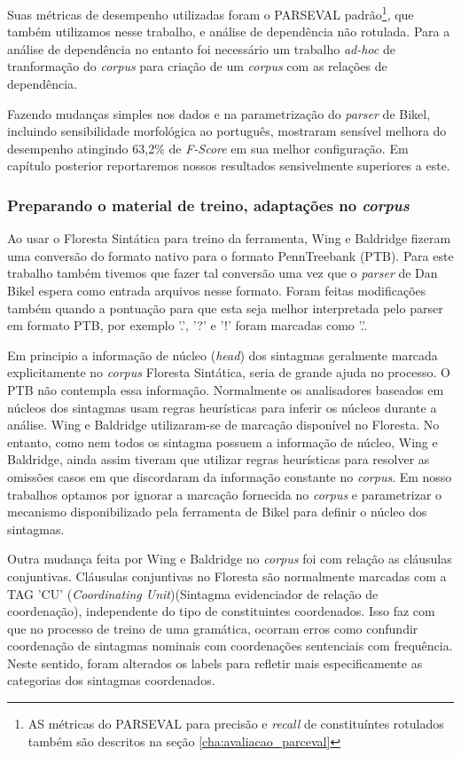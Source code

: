 Suas métricas de desempenho utilizadas foram o PARSEVAL padrão\footnote{AS métricas do PARSEVAL para precisão e \emph{recall} de constituíntes rotulados também são descritos na seção \ref{cha:avaliacao_parceval}}, que também utilizamos nesse trabalho, e análise de dependência não rotulada. Para a análise de dependência no entanto foi necessário um trabalho \emph{ad-hoc} de tranformação do \emph{corpus} para criação de um \emph{corpus} com as relações de dependência.

Fazendo mudanças simples nos dados e na parametrização do \emph{parser} de Bikel, incluindo sensibilidade morfológica ao português, mostraram sensível melhora do desempenho atingindo 63,2{\%} de \emph{F-Score} em sua melhor configuração. Em capítulo posterior reportaremos nossos resultados sensivelmente superiores a este.

\subsubsection{Preparando o material de treino, adaptações no \emph{corpus}} %
\label{sec:wing_baldridge_adapt_corpus}

Ao usar o Floresta Sintática para treino da ferramenta, Wing e Baldridge fizeram uma conversão do formato nativo para o formato PennTreebank (PTB). Para este trabalho também tivemos que fazer tal conversão uma vez que o \emph{parser} de Dan Bikel espera como entrada arquivos nesse formato. Foram feitas modificações também quando a pontuação para que esta seja melhor interpretada pelo parser em formato PTB, por exemplo '.', '?' e '!' foram marcadas como '.'. 

Em principio a informação de núcleo (\emph{head}) dos sintagmas geralmente marcada explicitamente no \emph{corpus} Floresta Sintática, seria de grande ajuda no processo. O PTB não contempla essa informação. Normalmente os analisadores baseados em núcleos dos sintagmas usam regras heurísticas para inferir os núcleos durante a análise. Wing e Baldridge utilizaram-se de marcação disponível no Floresta. No entanto, como nem todos os sintagma possuem a informação de núcleo, Wing e Baldridge, ainda assim tiveram que utilizar regras heurísticas para resolver as omissões casos em que discordaram da informação constante no \emph{corpus}. Em nosso trabalhos optamos por ignorar a marcação fornecida no \emph{corpus} e parametrizar o mecanismo disponibilizado pela ferramenta de Bikel para definir o núcleo dos sintagmas.

Outra mudança feita por Wing e Baldridge no \emph{corpus} foi com relação as cláusulas conjuntivas. Cláusulas conjuntivas no Floresta são normalmente marcadas com a TAG 'CU' (\emph{Coordinating Unit})(Sintagma evidenciador de relação de coordenação), independente do tipo de constituintes coordenados. Isso faz com que no processo de treino de uma gramática, ocorram erros como confundir coordenação de sintagmas nominais com coordenações sentenciais com frequência. Neste sentido, foram alterados os labels para refletir mais especificamente as categorias dos sintagmas coordenados.

